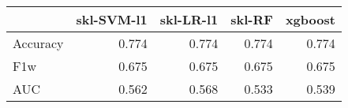 \begin{tabular}{lrrrr}
\toprule
{} &  skl-SVM-l1 &  skl-LR-l1 &  skl-RF &  xgboost \\
\midrule
Accuracy &       0.774 &      0.774 &   0.774 &    0.774 \\
F1w      &       0.675 &      0.675 &   0.675 &    0.675 \\
AUC      &       0.562 &      0.568 &   0.533 &    0.539 \\
\bottomrule
\end{tabular}
